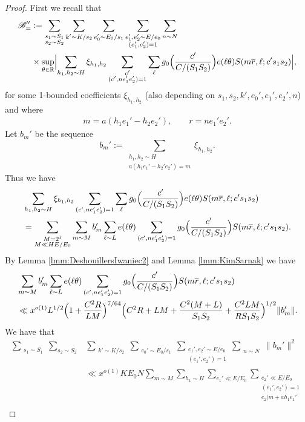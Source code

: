 \documentclass[10pt]{amsart}
\theoremstyle{plain}
\numberwithin{equation}{section}
\begin{document}
\begin{proof}
First we recall that
\begin{align*}
\mathscr{B}''_=&:=\sum_{\substack{s_1\sim S_1\\ s_2\sim S_2}}\sum_{\substack{k'\sim K/s_2}} \sum_{\substack{e_0'\sim E_0/s_1}}\sum_{\substack{e_1',e_2'\sim E/e_0\\ (e_1',e_2')=1}}\sum_{\substack{n\sim N}}\\
&\times\sup_{\theta\in\mathbb{R}}\Bigl|\sum_{\substack{h_1,h_2\sim H}}\xi_{h_1,h_2}\sum_{\substack{c'\\ (c',n e_1'e_2')=1}}\sum_{\ell}g_{0}\Bigl(\frac{c'}{C/(S_1S_2)}\Bigr)e(\ell \theta)S(m\overline{r},\ell;c's_1s_2)\Bigr|,
\end{align*}
for some 1-bounded coefficients $\xi_{h_1,h_2}$ (also depending on $s_1,s_2,k',e_0',e_1',e_2',n$) and where
\begin{align*}
m=a(h_1e_1'-h_2e_2'),\qquad 
r=n e_1'e_2'.
\end{align*}
Let $b_m'$ be the sequence
\[
b_m':=\sum_{\substack{h_1,h_2\sim H\\ a(h_1e_1'-h_2'e_2')=m}}\xi_{h_1,h_2}.
\]
Thus we have
\begin{align*}
&\sum_{h_1,h_2\sim H}\xi_{h_1,h_2}\sum_{(c',n e_1'e_2')=1}\sum_{\ell}g_{0}\Bigl(\frac{c'}{C/(S_1S_2)}\Bigr)e(\ell \theta)S(m\overline{r},\ell;c's_1s_2)\\
&=\sum_{\substack{M=2^j\\ M\ll HE/E_0}}\sum_{m\sim M}b_m'\sum_{\ell\sim L}e(\ell\theta)\sum_{(c',n e_1'e_2')=1}g_{0}\Bigl(\frac{c'}{C/(S_1S_2)}\Bigr)S(m\overline{r},\ell;c's_1s_2).
\end{align*}
By Lemma \ref{lmm:DeshouillersIwaniec2} and Lemma \ref{lmm:KimSarnak} we have
\begin{align*}
&\sum_{m\sim M}b_m'\sum_{\ell\sim L}e(\ell\theta)\sum_{(c',n e_1'e_2')=1}g_{0}\Bigl(\frac{c'}{C/(S_1S_2)}\Bigr)S(m\overline{r},\ell;c's_1s_2)\\
&\ll x^{o(1)} L^{1/2}\Bigl(1+\frac{C^2 R}{L M}\Bigr)^{7/64}\Bigl(C^2 R+L M+\frac{C^2 (M+L)}{S_1 S_2}+\frac{C^2 L M}{R S_1 S_2}\Bigr)^{1/2}\|b_m'\|.
\end{align*}
We have that
\begin{align*}
\sum_{\substack{s_1\sim S_1}}\sum_{s_2\sim S_2}&\sum_{\substack{k'\sim K/s_2}} \sum_{\substack{e_0'\sim E_0/s_1}}\sum_{\substack{e_1',e_2'\sim E/e_0\\ (e_1',e_2')=1}}\sum_{\substack{n\sim N}}\|b_m'\|^2\\
&\ll x^{o(1)} K E_0 N \sum_{m\sim M}\sum_{h_1\sim H}\sum_{e_1'\ll E/E_0}\sum_{\substack{e_2'\ll E/E_0\\ (e_1',e_2')=1\\ e_2|m+ah_1e_1'}}\\

\end{align*}
\end{proof}
\end{document}
